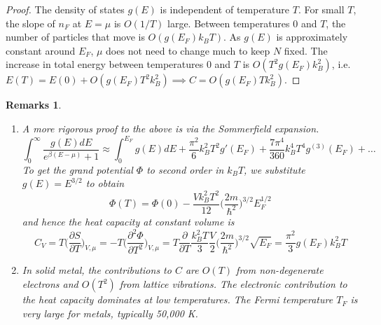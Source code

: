 \documentclass[a4paper]{article}
\newtheorem{remarks}{Remarks}[section]
\theoremstyle{new}
\begin{document}
\begin{proof}
The density of states $g(E)$ is independent of temperature $T$. For small $T$, the slope of $n_F$ at $E=\mu$ is $O(1/T)$ large. Between temperatures 0 and $T$, the number of particles that move is $O(g(E_F)k_BT)$. As $g(E)$ is approximately constant around $E_F$, $\mu$ does not need to change much to keep $N$ fixed. The increase in total energy between temperatures 0 and $T$ is $O(T^2g(E_F)k_B^2)$, i.e. $E(T)=E(0)+O(g(E_F)T^2k_B^2)\implies C=O(g(E_F)Tk_B^2)$. 
\end{proof}
\begin{center}
\end{center}
\begin{remarks}\leavevmode
\begin{enumerate}
\item A more rigorous proof to the above is via the Sommerfield expansion. 
$$\int_0^\infty\frac{g(E)dE}{e^{\beta(E-\mu)}+1}\approx\int_0^{E_F}g(E)dE+\frac{\pi^2}{6}k_B^2T^2g'(E_F)+\frac{7\pi^4}{360}k_B^4T^4g^{(3)}(E_F)+\dots$$
To get the grand potential $\Phi$ to second order in $k_BT$, we substitute $g(E)=E^{3/2}$ to obtain
$$\Phi(T)=\Phi(0)-\frac{Vk_B^2T^2}{12}\bigg(\frac{2m}{\hbar^2}\bigg)^{3/2}E_F^{1/2}$$
and hence the heat capacity at constant volume is
$$C_V=T\bigg(\frac{\partial S}{\partial T}\bigg)_{V,\mu}=-T\bigg(\frac{\partial^2\Phi}{\partial T^2}\bigg)_{V,\mu}=T\frac{\partial}{\partial T}\frac{k_B^2T}{3}\frac{V}{2}\bigg(\frac{2m}{\hbar^2}\bigg)^{3/2}\sqrt{E_F}=\frac{\pi^2}{3}g(E_F)k_B^2T$$
\item In solid metal, the contributions to $C$ are $O(T)$ from non-degenerate electrons and $O(T^2)$ from lattice vibrations. The electronic contribution to the heat capacity dominates at low temperatures. The Fermi temperature $T_F$ is very large for metals, typically 50,000 K.
\end{enumerate}
\end{remarks}
\newpage
\end{document}
